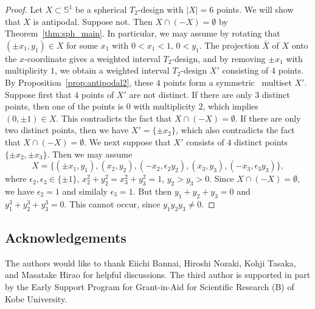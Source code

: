\documentclass[11pt]{amsart}
\theoremstyle{definition}
\newcommand{\aiantipodal}{a symmetric}
\begin{document}
\begin{proof}
Let $X\subset \mathbb{S}^1$ be a spherical $T_2$-design with $|X|=6$ points.
We will show that $X$ is antipodal. Suppose not. Then $X\cap(-X)=\emptyset$ by
Theorem~\ref{thm:sph_main}. In particular, we may assume
by rotating that $(\pm x_1,y_1)\in X$ for some $x_1$ with $0<x_1<1$, $0<y_1$.
The projection $\bar{X}$ of $X$ onto the $x$-coordinate gives a weighted interval $T_2$-design,
and by removing $\pm x_1$ with multiplicity $1$, we obtain a weighted interval $T_2$-design $X'$ consisting of $4$ points. By Proposition~\ref{prop:antipodal2}, these $4$ points form
\aiantipodal\
multiset $X'$. 
Suppose first that 
$4$ points of $X'$ are not distinct. If there are only $3$ distinct points, then 
one of the points
is $0$ with multiplicity $2$, which implies $(0,\pm1)\in X$.
This contradicts the fact that $X\cap(-X)=\emptyset$.
If there are only two distinct points, then
we have $X'=\{\pm x_2\}$, which also contradicts the fact that $X\cap(-X)=\emptyset$.
We next suppose that $X'$ consists of $4$ distinct points $\{\pm x_2,\pm x_3\}$.
Then we may assume
\[X=\{(\pm x_1,y_1),(x_2, y_2),(-x_2,\epsilon_2 y_2),
(x_3, y_3),(-x_3,\epsilon_3 y_3)\},\]
where $\epsilon_2,\epsilon_3\in\{\pm1\}$, $x_2^2+y_2^2=x_3^2+y_3^2=1$,
$y_2>y_3>0$.
Since $X\cap(-X)=\emptyset$, we have $\epsilon_2=1$ and similaly $\epsilon_3=1$.
But then $y_1+ y_2+ y_3=0$ and $y_1^3+ y_2^3+ y_3^3=0$.
This cannot occur, since $y_1y_2y_3\neq0$.
\end{proof}
\subsection*{Acknowledgements}
The authors would like to thank Eiichi Bannai, Hiroshi Nozaki, Kohji Tasaka, and Masatake Hirao for helpful discussions. The third author is supported in part by the Early Support Program for Grant-in-Aid for Scientific Research (B) of Kobe University.



\end{document}
